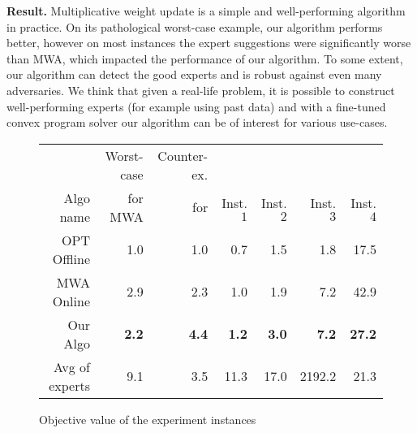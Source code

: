 \textbf{Result.} Multiplicative weight update is a simple and well-performing algorithm in practice. On its pathological worst-case example, our algorithm performs better, however on most instances the expert suggestions were significantly worse than MWA, which impacted the performance of our algorithm. To some extent, our algorithm can detect the good experts and is robust against even many adversaries. We think that given a real-life problem, it is possible to construct well-performing experts (for example using past data) and with a fine-tuned convex program solver our algorithm can be of interest for various use-cases.

\begin{figure}[h!]
\centering
\begin{tabular}{r|r|r|r|r|r|r}
          & Worst-case & Counter-ex. & & & & \\
Algo name & for MWA  & for \cite{AnandGe22:Online-Algorithms} & Inst. $1$ & Inst. $2$ & Inst. $3$ & Inst. $4$\\
\hline
OPT Offline            & 1.0 & 1.0 & 0.7 & 1.5 & 1.8 & 17.5 \\
MWA Online             & 2.9 & 2.3 & 1.0 & 1.9 & 7.2 & 42.9 \\
\hline
Our Algo           & {\bf 2.2} & {\bf 4.4} & {\bf 1.2} & {\bf 3.0} & {\bf 7.2}  & {\bf 27.2} \\
\hline
Avg of experts      & 9.1 & 3.5 & 11.3 & 17.0 & 2192.2 & 21.3 \\
\end{tabular}
\caption{Objective value of the experiment instances}
\label{fig:exp-objective}
\end{figure}

